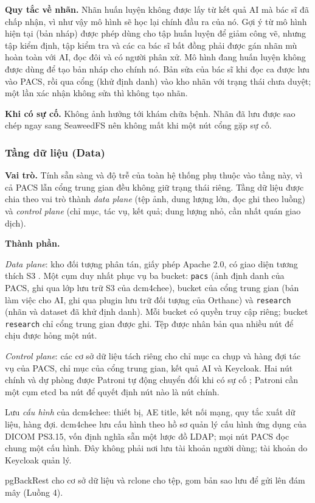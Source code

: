 \textbf{Quy tắc về nhãn.} Nhãn huấn luyện không được lấy từ kết quả AI mà bác sĩ đã
chấp nhận, vì như vậy mô hình sẽ học lại chính đầu ra của nó. Gợi ý từ mô hình hiện tại
(bản nháp) được phép dùng cho tập huấn luyện để giảm công vẽ, nhưng tập kiểm định, tập
kiểm tra và các ca bác sĩ bất đồng phải được gán nhãn mù hoàn toàn với AI, đọc đôi và
có người phân xử. Mô hình đang huấn luyện không được dùng để tạo bản nháp cho chính nó.
Bản sửa của bác sĩ khi đọc ca được lưu vào PACS, rồi qua cổng (khử định danh) vào kho
nhãn với trạng thái chưa duyệt; một lần xác nhận không sửa thì không tạo nhãn.

\textbf{Khi có sự cố.} Không ảnh hưởng tới khám chữa bệnh. Nhãn đã lưu được sao chép
ngay sang SeaweedFS nên không mất khi một nút cổng gặp sự cố.

\subsubsection{Tầng dữ liệu (Data)}
\label{sec:datalayer}

\textbf{Vai trò.} Tính sẵn sàng và độ trễ của toàn hệ thống phụ thuộc vào tầng này, vì
cả PACS lẫn cổng trung gian đều không giữ trạng thái riêng. Tầng dữ liệu được chia
theo vai trò thành \emph{data plane} (tệp ảnh, dung lượng lớn, đọc ghi theo luồng) và
\emph{control plane} (chỉ mục, tác vụ, kết quả; dung lượng nhỏ, cần nhất quán giao
dịch).

\textbf{Thành phần.}
\begin{description}[leftmargin=3.4cm,style=nextline]
\item[SeaweedFS] \emph{Data plane}: kho đối tượng phân tán, giấy phép Apache 2.0, có
      giao diện tương thích S3 \cite{seaweedfs}. Một cụm duy nhất phục vụ ba bucket:
      \texttt{pacs} (ảnh định danh của PACS, ghi qua lớp lưu trữ S3 của dcm4chee), bucket
      của cổng trung gian (bản làm việc cho AI, ghi qua plugin lưu trữ đối tượng của
      Orthanc) và \texttt{research} (nhãn và dataset đã khử định danh). Mỗi bucket có
      quyền truy cập riêng; bucket \texttt{research} chỉ cổng trung gian được ghi. Tệp
      được nhân bản qua nhiều nút để chịu được hỏng một nút.
\item[PostgreSQL] \emph{Control plane}: các cơ sở dữ liệu tách riêng cho chỉ mục ca
      chụp và hàng đợi tác vụ của PACS, chỉ mục của cổng trung gian, kết quả AI và
      Keycloak. Hai nút chính và dự phòng được Patroni tự động chuyển đổi khi có sự cố
      \cite{patroni}; Patroni cần một cụm etcd ba nút để quyết định nút nào là nút chính.
\item[OpenLDAP] Lưu \emph{cấu hình} của dcm4chee: thiết bị, AE title, kết nối mạng,
      quy tắc xuất dữ liệu, hàng đợi. dcm4chee lưu cấu hình theo hồ sơ quản lý cấu hình
      ứng dụng của DICOM PS3.15, vốn định nghĩa sẵn một lược đồ LDAP; mọi nút PACS đọc
      chung một cấu hình. Đây không phải nơi lưu tài khoản người dùng; tài khoản do
      Keycloak quản lý.
\item[Cổng sao lưu] pgBackRest cho cơ sở dữ liệu và rclone cho tệp, gom bản sao lưu
      để gửi lên đám mây (Luồng 4).
\end{description}

